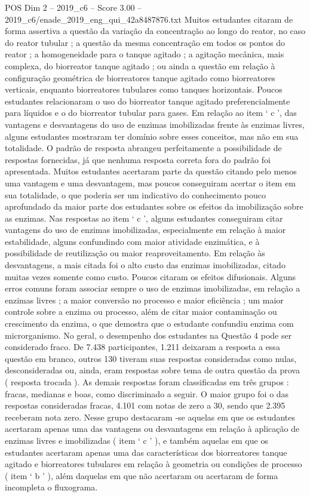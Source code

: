\begin{textsample}{POS Dim 2 – 2019\_c6 – Score 3.00 – 2019\_c6/enade\_2019\_eng\_qui\_42a8487876.txt}
Muitos estudantes citaram de forma assertiva a questão da variação da concentração ao longo do reator, no caso do reator tubular ; a questão da mesma concentração em todos os pontos do reator ; a homogeneidade para o tanque agitado ; a agitação mecânica, mais complexa, do biorreator tanque agitado ; ou ainda a questão em relação à configuração geométrica de biorreatores tanque agitado como biorreatores verticais, enquanto biorreatores tubulares como tanques horizontais.
Poucos estudantes relacionaram o uso do biorreator tanque agitado preferencialmente para líquidos e o do biorreator tubular para gases.
Em relação ao item ‘ c ’, das vantagens e desvantagens do uso de enzimas imobilizadas frente às enzimas livres, alguns estudantes mostraram ter domínio sobre esses conceitos, mas não em sua totalidade.
O padrão de resposta abrangeu perfeitamente a possibilidade de respostas fornecidas, já que nenhuma resposta correta fora do padrão foi apresentada.
Muitos estudantes acertaram parte da questão citando pelo menos uma vantagem e uma desvantagem, mas poucos conseguiram acertar o item em sua totalidade, o que poderia ser um indicativo do conhecimento pouco aprofundado da maior parte dos estudantes sobre os efeitos da imobilização sobre as enzimas.
Nas respostas ao item ‘ c ’, alguns estudantes conseguiram citar vantagens do uso de enzimas imobilizadas, especialmente em relação à maior estabilidade, alguns confundindo com maior atividade enzimática, e à possibilidade de reutilização ou maior reaproveitamento.
Em relação às desvantagens, a mais citada foi o alto custo das enzimas imobilizadas, citado muitas vezes somente como custo.
Poucos citaram os efeitos difusionais.
Alguns erros comuns foram associar sempre o uso de enzimas imobilizadas, em relação a enzimas livres ; a maior conversão no processo e maior eficiência ; um maior controle sobre a enzima ou processo, além de citar maior contaminação ou crescimento da enzima, o que demostra que o estudante confundiu enzima com microrganismo.
No geral, o desempenho dos estudantes na Questão 4 pode ser considerado fraco.
De 7.438 participantes, 1.211 deixaram a resposta a essa questão em branco, outros 130 tiveram suas respostas consideradas como nulas, desconsideradas ou, ainda, eram respostas sobre tema de outra questão da prova ( resposta trocada ).
As demais respostas foram classificadas em três grupos : fracas, medianas e boas, como discriminado a seguir.
O maior grupo foi o das respostas consideradas fracas, 4.101 com notas de zero a 30, sendo que 2.395 receberam nota zero.
Nesse grupo destacaram -se aquelas em que os estudantes acertaram apenas uma das vantagens ou desvantagens em relação à aplicação de enzimas livres e imobilizadas ( item ‘ c ’ ), e também aquelas em que os estudantes acertaram apenas uma das características dos biorreatores tanque agitado e biorreatores tubulares em relação à geometria ou condições de processo ( item ‘ b ’ ), além daquelas em que não acertaram ou acertaram de forma incompleta o fluxograma.

\end{textsample}
